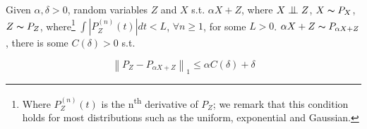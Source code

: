\begin{lemma} 
    
    Given $\alpha, \delta > 0$, random variables $Z$ and $X$ s.t. $\alpha X + Z$, where $X \bigCI Z$, 
$X \thicksim P_X$, $Z \thicksim P_Z$, where\footnote{
    Where $P_{Z}^{(n)}(t)$ is the n\textsuperscript{th} derivative of $P_Z$; we remark that this 
    condition holds for most distributions such as the uniform, exponential and Gaussian.} 
$\int \left| P_{Z}^{(n)}(t) \right| d t < L$, $\forall n\geq 1$, for some $L > 0$.
$\alpha X + Z \thicksim  P_{\alpha X + Z}$, there is some $C(\delta) > 0$ s.t.

$$
\left\|P_{Z} -  P_{\alpha X + Z} \right\|_{1} \leqslant \alpha C(\delta) + \delta
$$
\label{lemma:conv_bound}
\end{lemma}

 

